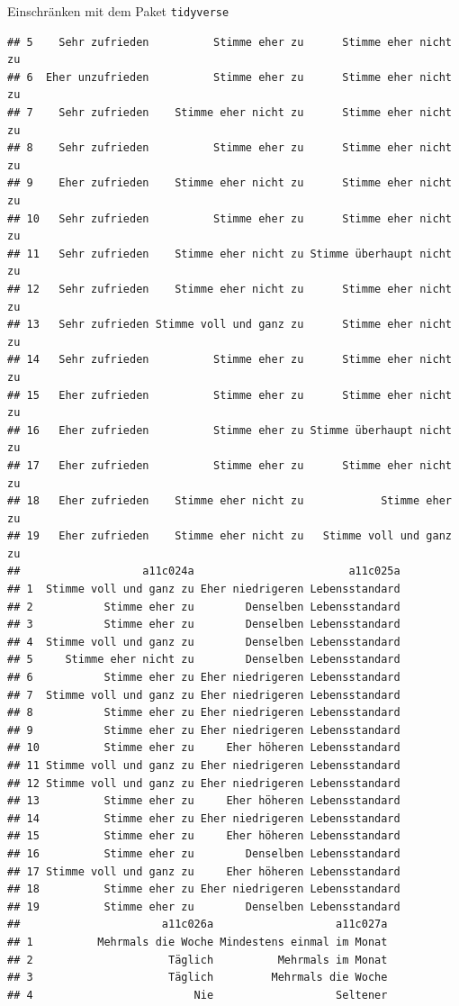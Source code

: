 \documentclass[ignorenonframetext,]{beamer}
\begin{document}
\begin{frame}[fragile]{Einschränken mit dem Paket \texttt{tidyverse}}
\begin{verbatim}
## 5    Sehr zufrieden          Stimme eher zu      Stimme eher nicht zu
## 6  Eher unzufrieden          Stimme eher zu      Stimme eher nicht zu
## 7    Sehr zufrieden    Stimme eher nicht zu      Stimme eher nicht zu
## 8    Sehr zufrieden          Stimme eher zu      Stimme eher nicht zu
## 9    Eher zufrieden    Stimme eher nicht zu      Stimme eher nicht zu
## 10   Sehr zufrieden          Stimme eher zu      Stimme eher nicht zu
## 11   Sehr zufrieden    Stimme eher nicht zu Stimme überhaupt nicht zu
## 12   Sehr zufrieden    Stimme eher nicht zu      Stimme eher nicht zu
## 13   Sehr zufrieden Stimme voll und ganz zu      Stimme eher nicht zu
## 14   Sehr zufrieden          Stimme eher zu      Stimme eher nicht zu
## 15   Eher zufrieden          Stimme eher zu      Stimme eher nicht zu
## 16   Eher zufrieden          Stimme eher zu Stimme überhaupt nicht zu
## 17   Eher zufrieden          Stimme eher zu      Stimme eher nicht zu
## 18   Eher zufrieden    Stimme eher nicht zu            Stimme eher zu
## 19   Eher zufrieden    Stimme eher nicht zu   Stimme voll und ganz zu
##                   a11c024a                        a11c025a
## 1  Stimme voll und ganz zu Eher niedrigeren Lebensstandard
## 2           Stimme eher zu        Denselben Lebensstandard
## 3           Stimme eher zu        Denselben Lebensstandard
## 4  Stimme voll und ganz zu        Denselben Lebensstandard
## 5     Stimme eher nicht zu        Denselben Lebensstandard
## 6           Stimme eher zu Eher niedrigeren Lebensstandard
## 7  Stimme voll und ganz zu Eher niedrigeren Lebensstandard
## 8           Stimme eher zu Eher niedrigeren Lebensstandard
## 9           Stimme eher zu Eher niedrigeren Lebensstandard
## 10          Stimme eher zu     Eher höheren Lebensstandard
## 11 Stimme voll und ganz zu Eher niedrigeren Lebensstandard
## 12 Stimme voll und ganz zu Eher niedrigeren Lebensstandard
## 13          Stimme eher zu     Eher höheren Lebensstandard
## 14          Stimme eher zu Eher niedrigeren Lebensstandard
## 15          Stimme eher zu     Eher höheren Lebensstandard
## 16          Stimme eher zu        Denselben Lebensstandard
## 17 Stimme voll und ganz zu     Eher höheren Lebensstandard
## 18          Stimme eher zu Eher niedrigeren Lebensstandard
## 19          Stimme eher zu        Denselben Lebensstandard
##                      a11c026a                   a11c027a
## 1          Mehrmals die Woche Mindestens einmal im Monat
## 2                     Täglich          Mehrmals im Monat
## 3                     Täglich         Mehrmals die Woche
## 4                         Nie                   Seltener

\end{verbatim}
\end{frame}
\end{document}
